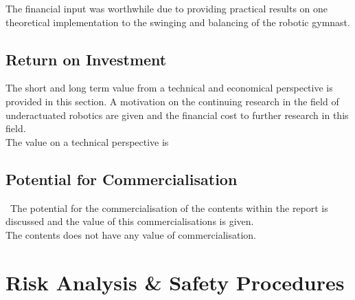 The financial input was worthwhile due to providing practical results on one theoretical implementation to the swinging and balancing of the robotic gymnast. \\


\subsection{Return on Investment}
The short and long term value from a technical and economical perspective is provided in this section. A motivation on the continuing research in the field of underactuated robotics are given and the financial cost to further research in this field.\\

The value on a technical perspective is 




\subsection{Potential for Commercialisation}\
The potential for the commercialisation of the contents within the report is discussed and the value of this commercialisations is given.\\

The contents does not have any value of commercialisation. 




\section{Risk Analysis \& Safety Procedures}









\endinput
